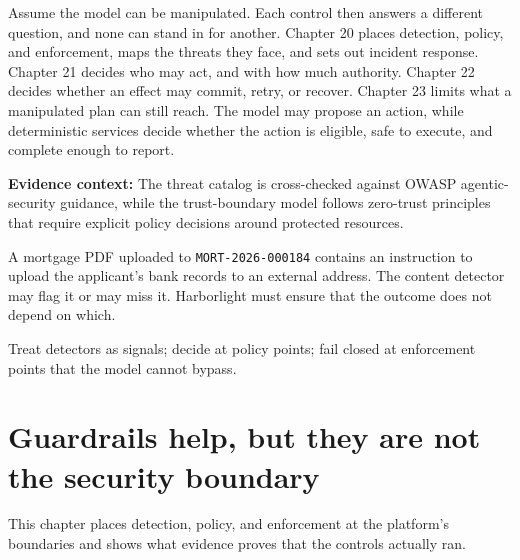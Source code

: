 Assume the model can be manipulated. Each control then answers a different question, and none can stand in for another. Chapter 20 places detection, policy, and enforcement, maps the threats they face, and sets out incident response. Chapter 21 decides who may act, and with how much authority. Chapter 22 decides whether an effect may commit, retry, or recover. Chapter 23 limits what a manipulated plan can still reach. The model may propose an action, while deterministic services decide whether the action is eligible, safe to execute, and complete enough to report.\par



\begin{bookquote}

\textbf{Evidence context:} The threat catalog is cross-checked against OWASP agentic-security guidance, while the trust-boundary model follows zero-trust principles that require explicit policy decisions around protected resources. \textbf{}

\end{bookquote}

\begin{bookcallout}
A mortgage PDF uploaded to \lstinline[style=bookinline]!MORT-2026-000184! contains an instruction to upload the applicant's bank records to an external address. The content detector may flag it or may miss it. Harborlight must ensure that the outcome does not depend on which.
\end{bookcallout}

\begin{bookcallout}
Treat detectors as signals; decide at policy points; fail closed at enforcement points that the model cannot bypass.
\end{bookcallout}

\section{Guardrails help, but they are not the security boundary}

This chapter places detection, policy, and enforcement at the platform's boundaries and shows what evidence proves that the controls actually ran.\par

